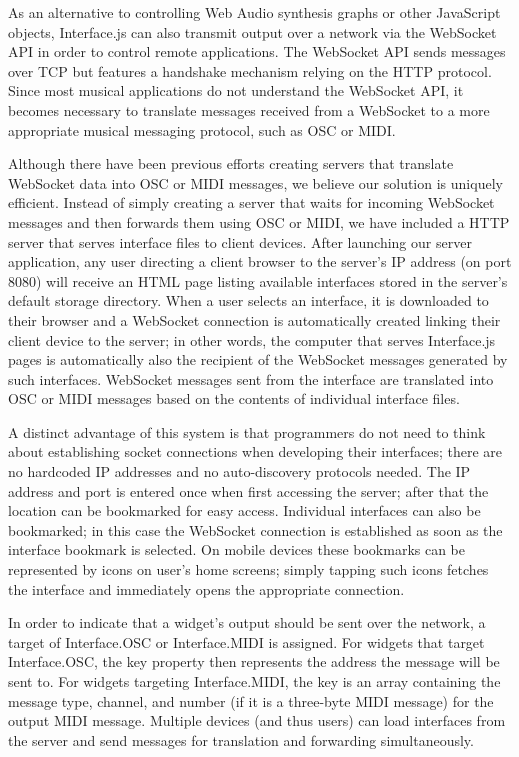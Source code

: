 As an alternative to controlling Web Audio synthesis graphs or other JavaScript objects, Interface.js can also transmit output over a network via the WebSocket API in order to control remote applications. The WebSocket API sends messages over TCP but features a handshake mechanism relying on the HTTP protocol. Since most musical applications do not understand the WebSocket API, it becomes necessary to translate messages received from a WebSocket to a more appropriate musical messaging protocol, such as OSC or MIDI.

Although there have been previous efforts creating servers that translate WebSocket data into OSC or MIDI messages, we believe our solution is uniquely efficient. Instead of simply creating a server that waits for incoming WebSocket messages and then forwards them using OSC or MIDI, we have included a HTTP server that serves interface files to client devices. After launching our server application, any user directing a client browser to the server's IP address (on port 8080) will receive an HTML page listing available interfaces stored in the server's default storage directory. When a user selects an interface, it is downloaded to their browser and a WebSocket connection is automatically created linking their client device to the server; in other words, the computer that serves Interface.js pages is automatically also the recipient of the WebSocket messages generated by such interfaces. WebSocket messages sent from the interface are translated into OSC or MIDI messages based on the contents of individual interface files.  

A distinct advantage of this system is that programmers do not need to think about establishing socket connections when developing their interfaces; there are no hardcoded IP addresses and no auto-discovery protocols needed. The IP address and port is entered once when first accessing the server; after that the location can be bookmarked for easy access. Individual interfaces can also be bookmarked; in this case the WebSocket connection is established as soon as the interface bookmark is selected. On mobile devices these bookmarks can be represented by icons on user's home screens; simply tapping such icons fetches the interface and immediately opens the appropriate connection.

In order to indicate that a widget's output should be sent over the network, a target of Interface.OSC or Interface.MIDI is assigned. For widgets that target Interface.OSC, the key property then represents the address the message will be sent to. For widgets targeting Interface.MIDI, the key is an array containing the message type, channel, and number (if it is a three-byte MIDI message) for the output MIDI message. Multiple devices (and thus users) can load interfaces from the server and send messages for translation and forwarding simultaneously.

